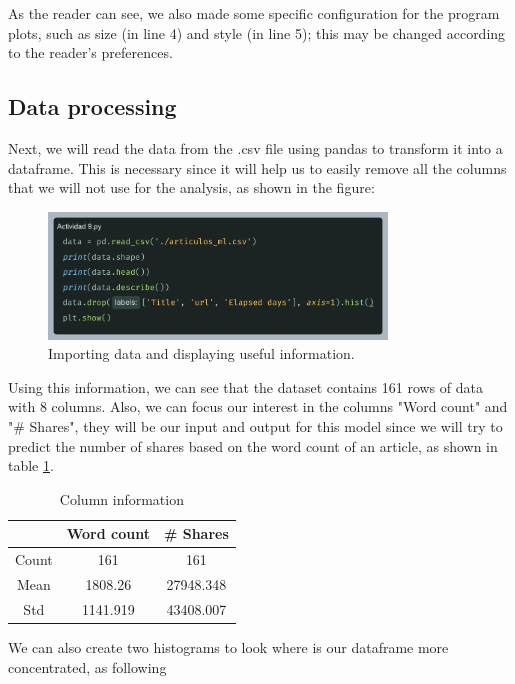 \documentclass[10pt]{article}
\begin{document}
As the reader can see, we also made some specific configuration for the program plots, such as size (in line 4) and style (in line 5); this may be changed according to the reader's preferences.

\subsection{Data processing}
Next, we will read the data from the .csv file using pandas to transform it into a dataframe. This is necessary since it will help us to easily remove all the columns that we will not use for the analysis, as shown in the figure: \par

\begin{figure}[h]
  \centering
  \includegraphics[width=90mm]{2025-03-26-14-19-30.png}
  \caption{Importing data and displaying useful information.}
\end{figure}

Using this information, we can see that the dataset contains 161 rows of data with 8 columns. Also, we can focus our interest in the columns "Word count" and "\# Shares", they will be our input and output for this model since we will try to predict the number of shares based on the word count of an article, as shown in table \ref{col_info}. \par

\begin{table}[!ht]
  \centering
  \caption{Column information}
  \label{col_info}
    \begin{tabular}{|c|c|c|}
      \hline
       & Word count & \# Shares \\
      \hline
      Count & 161 & 161 \\
      \hline
      Mean & 1808.26 & 27948.348 \\
      \hline
      Std & 1141.919 & 43408.007 \\
      \hline
    \end{tabular}
\end{table}

We can also create two histograms to look where is our dataframe more concentrated, as following \par
\end{document}
